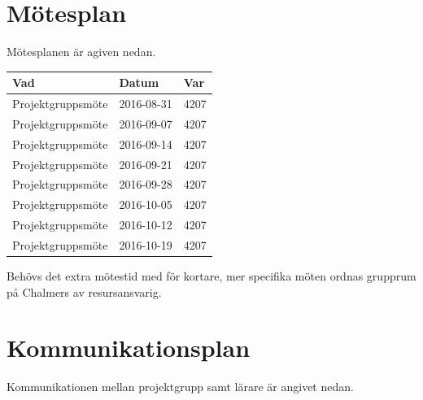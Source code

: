 \documentclass[a4paper]{article}
\begin{document}
\section{Mötesplan}
Mötesplanen är agiven nedan.
\vspace{5mm}

\begin{tabular}{|l|l|l|} \hline
\bf Vad           & \bf Datum  & \bf Var \\ \hline \hline
Projektgruppsmöte & 2016-08-31 &    4207 \\ \hline
Projektgruppsmöte & 2016-09-07 &    4207 \\ \hline
Projektgruppsmöte & 2016-09-14 &    4207 \\ \hline
Projektgruppsmöte & 2016-09-21 &    4207 \\ \hline
Projektgruppsmöte & 2016-09-28 &    4207 \\ \hline
Projektgruppsmöte & 2016-10-05 &    4207 \\ \hline
Projektgruppsmöte & 2016-10-12 &    4207 \\ \hline
Projektgruppsmöte & 2016-10-19 &    4207 \\ \hline
\end{tabular}

\vspace{5mm}
\noindent Behövs det extra mötestid med för kortare, mer specifika möten ordnas grupprum på Chalmers av resursansvarig.



\section{Kommunikationsplan}
Kommunikationen mellan projektgrupp samt lärare är angivet nedan.
\vspace{5mm}
\end{document}
